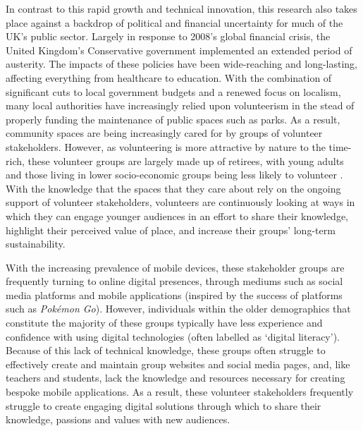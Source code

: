 In contrast to this rapid growth and technical innovation, this research also takes place against a backdrop of political and financial uncertainty for much of the UK's public sector. Largely in response to 2008's global financial crisis, the United Kingdom's Conservative government implemented an extended period of austerity. The impacts of these policies have been wide-reaching and long-lasting, affecting everything from healthcare to education. With the combination of significant cuts to local government budgets and a renewed focus on localism, many local authorities have increasingly relied upon volunteerism in the stead of properly funding the maintenance of public spaces such as parks. As a result, community spaces are being increasingly cared for by groups of volunteer stakeholders. However, as volunteering is more attractive by nature to the time-rich, these volunteer groups are largely made up of retirees, with young adults and those living in lower socio-economic groups being less likely to volunteer \citep{ncvo2019}. With the knowledge that the spaces that they care about rely on the ongoing support of volunteer stakeholders, volunteers are continuously looking at ways in which they can engage younger audiences in an effort to share their knowledge, highlight their perceived value of place, and increase their groups' long-term sustainability. 

With the increasing prevalence of mobile devices, these stakeholder groups are frequently turning to online digital presences, through mediums such as social media platforms and mobile applications (inspired by the success of platforms such as \textit{Pok\'emon Go}). However, individuals within the older demographics that constitute the majority of these groups typically have less experience and confidence with using digital technologies (often labelled as `digital literacy'). Because of this lack of technical knowledge, these groups often struggle to effectively create and maintain group websites and social media pages, and, like teachers and students, lack the knowledge and resources necessary for creating bespoke mobile applications. As a result, these volunteer stakeholders frequently struggle to create engaging digital solutions through which to share their knowledge, passions and values with new audiences.

